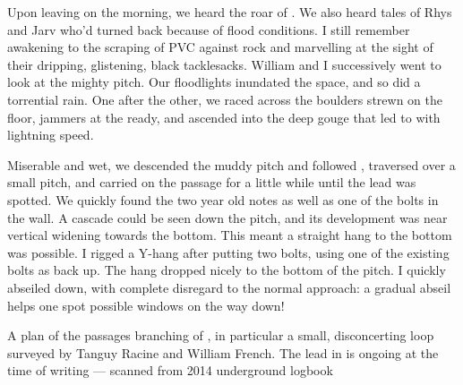 \begin{marginfigure}
\end{marginfigure}

Upon leaving  on the morning, we heard the roar of . We also heard tales of Rhys and Jarv who'd turned back because of flood conditions. I still remember awakening to the scraping of PVC against rock and marvelling at  the sight of their dripping, glistening, black tacklesacks. William and I successively went to look at the mighty  pitch. Our floodlights inundated the space, and so did a torrential rain. One after the other, we raced across the boulders strewn on the floor, jammers at the ready, and ascended into the deep gouge that led to  with lightning speed.

Miserable and wet, we descended the muddy pitch and followed , traversed over a small pitch, and carried on the passage for a little while until the  lead was spotted. We quickly found the two year old notes as well as one of the bolts in the wall. A cascade could be seen down the pitch, and its development was near vertical widening towards the bottom. This meant a straight hang to the bottom was possible. I rigged a Y-hang after putting two bolts, using one of the existing bolts as back up. The hang dropped nicely to the bottom of the pitch. I quickly abseiled down, with complete disregard to the normal approach: a gradual abseil helps one spot possible windows on the way down! 

\begin{survey}[t]
	\checkoddpage \ifoddpage \forcerectofloat \else \forceversofloat \fi
    		\centering
    
   		\caption[A plan of the passages branching of \protect{}]{A plan of the passages branching of \protect{}, in particular a small, disconcerting loop surveyed by Tanguy Racine and William French. The lead in \protect{} is ongoing at the time of writing
    		 --- scanned from 2014 underground logbook}
		 \label{serrure scan}
\end{survey}

